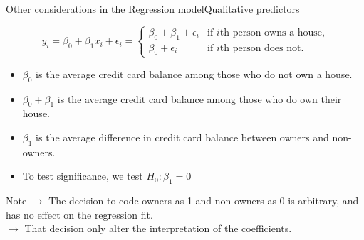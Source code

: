 \begin{frame}{Other considerations in the Regression model}{Qualitative predictors}
    
    \begin{equation*}
        y_i = \beta_0 + \beta_1 x_i + \epsilon_i = 
        \begin{cases}
              \beta_0 + \beta_1 + \epsilon_i & \text{if $i$th person owns a house,} \\
                 \beta_0 + \epsilon_i & \text{if $i$th person does not.}
        \end{cases}
    \end{equation*}

\begin{itemize}
    \item $\beta_0$ is the average credit card balance among those who do not own a house. \pause
    \item $\beta_0 + \beta_1$ is the average credit card balance among those who do own their house. \pause
    \item $\beta_1$ is the average diﬀerence in credit card balance between owners and non-owners. \pause
    \item To test significance, we test $H_0: \beta_1 = 0$ \pause
\end{itemize}

\begin{block}{Note}
    $\rightarrow$ The decision to code owners as 1 and non-owners as 0 is arbitrary, and has no eﬀect on the regression fit. \pause \\
    $\rightarrow$ That decision only alter the interpretation of the coeﬃcients.
\end{block}


\end{frame}


